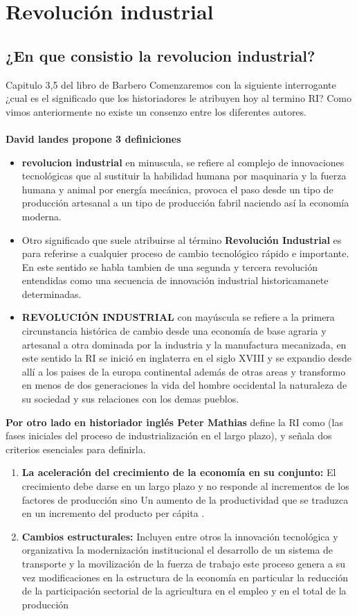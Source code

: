 \documentclass[12pt]{book}
\begin{document}
\tableofcontents
\chapter{Revoluci\'on industrial}
\section{¿En que consistio la revolucion industrial?}
Capitulo 3,5 del libro de Barbero
 Comenzaremos con la siguiente interrogante ¿cual es el significado que los historiadores le atribuyen hoy al termino RI? Como vimos anteriormente no existe un consenzo entre los diferentes autores.
 \\
\\
\textbf{David landes propone 3 definiciones}
\begin{itemize}
 \item \textbf{revolucion industrial} en minuscula, se refiere al complejo de innovaciones tecnol\'ogicas que al sustituir la habilidad humana por maquinaria y la fuerza humana y animal por energ\'ia mec\'anica, provoca el paso desde un tipo de producci\'on artesanal a un tipo de producci\'on fabril naciendo as\'i la econom\'ia moderna.
 \item Otro significado que suele atribuirse al t\'ermino \textbf{Revoluci\'on Industrial}  es para referirse a cualquier proceso de cambio tecnol\'ogico r\'apido e importante.	En este sentido se habla tambien de una segunda y tercera revoluci\'on entendidas como una secuencia de innovaci\'on industrial historicamanete determinadas.
 \item \textbf{REVOLUCI\'ON INDUSTRIAL} con may\'uscula se refiere a la primera circunstancia hist\'orica de cambio desde una econom\'ia de base agraria y artesanal a otra dominada por la industria y la manufactura mecanizada, en este sentido la RI se inici\'o en inglaterra en el siglo XVIII y se expandio desde all\'i a los paises de la europa continental adem\'as de otras areas y transformo en menos de dos generaciones la vida del hombre occidental la naturaleza de su sociedad y sus relaciones con los demas pueblos.
 \end{itemize} 
\textbf{Por otro lado en historiador ingl\'es Peter Mathias} define la RI como (las fases iniciales del proceso de industrializaci\'on en el largo plazo), y señala dos criterios esenciales para definirla.
\begin{enumerate}
\item \textbf{La aceleraci\'on del crecimiento de la econom\'ia en su conjunto: }El crecimiento debe darse en un largo plazo y no responde al incrementos de los factores de producción sino Un aumento de la productividad que se traduzca en un incremento del producto per cápita .
\item \textbf{Cambios estructurales: }Incluyen entre otros la innovación tecnológica y organizativa la modernización institucional el desarrollo de un sistema de transporte y la movilización de la fuerza de trabajo este proceso genera a su vez modificaciones en la estructura de la economía en particular la reducción de la participación sectorial de la agricultura en el empleo y en el total de la producción
\end{enumerate}
\end{document}
